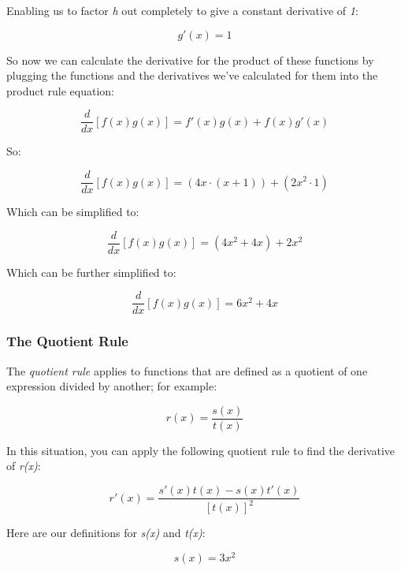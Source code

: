 \documentclass[11pt]{article}
\begin{document}
Enabling us to factor \emph{h} out completely to give a constant
derivative of \emph{1}:

\begin{equation}g'(x) = 1 \end{equation}

So now we can calculate the derivative for the product of these
functions by plugging the functions and the derivatives we've calculated
for them into the product rule equation:

\begin{equation}\frac{d}{dx}[f(x)g(x)] = f'(x)g(x) + f(x)g'(x) \end{equation}

So:

\begin{equation}\frac{d}{dx}[f(x)g(x)] = (4x \cdot (x + 1)) + (2x^{2} \cdot 1) \end{equation}

Which can be simplified to:

\begin{equation}\frac{d}{dx}[f(x)g(x)] = (4x^{2} + 4x) + 2x^{2} \end{equation}

Which can be further simplified to:

\begin{equation}\frac{d}{dx}[f(x)g(x)] = 6x^{2} + 4x \end{equation}

    \subsubsection{The Quotient Rule}\label{the-quotient-rule}

The \emph{quotient rule} applies to functions that are defined as a
quotient of one expression divided by another; for example:

\begin{equation}r(x) = \frac{s(x)}{t(x)} \end{equation}

In this situation, you can apply the following quotient rule to find the
derivative of \emph{r(x)}:

\begin{equation}r'(x) = \frac{s'(x)t(x) - s(x)t'(x)}{[t(x)]^{2}} \end{equation}

Here are our definitions for \emph{s(x)} and \emph{t(x)}:

\begin{equation}s(x) = 3x^{2} \end{equation}
\end{document}

